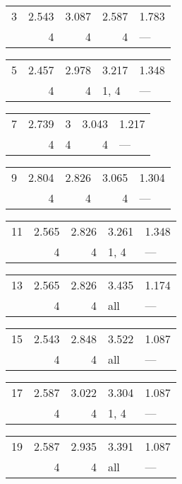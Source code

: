 \begin{tabular}{lrrrl}
\toprule
 3 & 2.543 & 3.087 & 2.587 & 1.783 \\
   & 4     & 4     & 4     & ---   \\
\bottomrule
\end{tabular}
\begin{tabular}{lrrll}
\toprule
 5 & 2.457 & 2.978 & 3.217 & 1.348 \\
   & 4     & 4     & 1, 4  & ---   \\
\bottomrule
\end{tabular}
\begin{tabular}{lrrrl}
\toprule
 7 & 2.739 & 3 & 3.043 & 1.217 \\
   & 4     & 4 & 4     & ---   \\
\bottomrule
\end{tabular}
\begin{tabular}{lrrrl}
\toprule
 9 & 2.804 & 2.826 & 3.065 & 1.304 \\
   & 4     & 4     & 4     & ---   \\
\bottomrule
\end{tabular}
\begin{tabular}{lrrll}
\toprule
 11 & 2.565 & 2.826 & 3.261 & 1.348 \\
    & 4     & 4     & 1, 4  & ---   \\
\bottomrule
\end{tabular}
\begin{tabular}{lrrll}
\toprule
 13 & 2.565 & 2.826 & 3.435 & 1.174 \\
    & 4     & 4     & all   & ---   \\
\bottomrule
\end{tabular}
\begin{tabular}{lrrll}
\toprule
 15 & 2.543 & 2.848 & 3.522 & 1.087 \\
    & 4     & 4     & all   & ---   \\
\bottomrule
\end{tabular}
\begin{tabular}{lrrll}
\toprule
 17 & 2.587 & 3.022 & 3.304 & 1.087 \\
    & 4     & 4     & 1, 4  & ---   \\
\bottomrule
\end{tabular}
\begin{tabular}{lrrll}
\toprule
 19 & 2.587 & 2.935 & 3.391 & 1.087 \\
    & 4     & 4     & all   & ---   \\
\bottomrule
\end{tabular}
